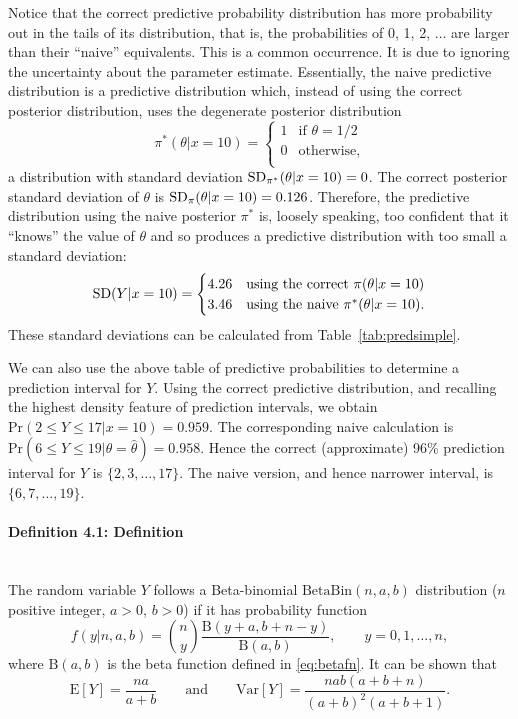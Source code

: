 {\begin{table}[ht]
\end{table}
Notice that the correct predictive probability distribution has more
probability out in the tails of its distribution, that is, the
probabilities of 0, 1, 2, $\ldots$ are larger than their ``naive''
equivalents. This is a common occurrence. It is due to ignoring the
uncertainty about the parameter estimate. Essentially, the naive
predictive distribution is a predictive distribution which, instead of
using the correct posterior distribution, uses the degenerate
posterior distribution
\begin{equation*}
\pi^*(\theta|x=10)=\begin{cases} 1 & \text{if } \theta=1/2 \\
                                 0 & \text{otherwise}, \\
              \end{cases}
\end{equation*}
a distribution with standard deviation $\textnormal{SD}_{\pi^*}(\theta|x=10)=0$.
The correct posterior standard deviation of $\theta$ is
$\textnormal{SD}_\pi(\theta|x=10)=0.126$.  Therefore, the predictive distribution
using the naive posterior $\pi^*$ is, loosely speaking, too confident
that it ``knows'' the value of $\theta$ and so produces a predictive
distribution with too small a standard deviation:
\begin{equation*}
\textnormal{SD}(Y|x=10)=
\begin{cases} 4.26  & \text{using the correct }\pi(\theta|x=10) \\
              3.46  & \text{using the naive }\pi^*(\theta|x=10). \\
         \end{cases}
\end{equation*}
These standard deviations can be calculated from
Table~\ref{tab:predsimple}. 

\newpage

We can also use the above table of predictive probabilities to determine a
prediction interval for $Y$. Using the correct predictive
distribution, and recalling the highest density feature of prediction
intervals, we obtain $\text{Pr}(2\leq Y\leq 17|x=10)=0.959$. The
corresponding naive calculation is $\text{Pr}(6\leq Y\leq
19|\theta=\hat{\theta})=0.958$. Hence the correct (approximate) 96\%
prediction interval for $Y$ is $\{2,3,\ldots,17\}$. The naive version,
and hence narrower interval, is $\{6,7,\ldots,19\}$.}

\paragraph{Definition 4.1: Definition}{~\\
The random variable $Y$ follows a Beta-binomial $\text{BetaBin}(n,a,b)$
distribution ($n$ positive integer, $a>0$, $b>0$) if it has
probability function
$$f(y|n,a,b)=\binom{n}{y}\frac{\mathrm{B}(y+a,b+n-y)}{\mathrm{B}(a,b)}, \quad\quad
y=0,1,\ldots,n,$$ 
where $\mathrm{B}(a,b)$ is the beta function defined in \eqref{eq:betafn}. It can be shown that
$$\text{E}[Y] =\frac{na}{a+b}\quad\quad\text{and}\quad\quad
\text{Var}[Y]=\frac{nab(a+b+n)}{(a+b)^2(a+b+1)}. $$}

